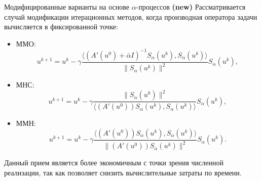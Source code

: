 \documentclass[10pt,pdf, mathserif, hyperref={unicode}]{beamer}
\begin{document}
\begin{frame}{ Модифицированные варианты на основе $\alpha$-процессов \textbf{(new)}}
	Рассматривается случай модификации итерационных методов, когда производная оператора задачи вычисляется 
        в фиксированной точке:
	\begin{itemize}
		\item ММО: $$u^{k+1}=u^k-\gamma\frac{\big\langle(A'(u^0)+\bar{\alpha}I)^{-1}S_\alpha(u^k),S_\alpha(u^k)\big\rangle}{\|S_\alpha(u^k)\|^2}S_\alpha(u^k),$$
		\item МНС:
		$$u^{k+1}=u^k-\gamma\frac{\|S_\alpha(u^k)\|^2}{\big\langle(A'(u^0))S_\alpha(u^k), S_\alpha(u^k)\big\rangle}S_\alpha(u^k),$$
		\item ММН:
		$$u^{k+1}=u^k-\gamma\frac{\big\langle(A'(u^0))S_\alpha(u^k), S_\alpha(u^k)\big\rangle}{\|(A'(u^0))S_\alpha(u^k)\|^2}S_\alpha(u^k).$$
	\end{itemize}
	
	\smallskip
	Данный прием является более экономичным с точки зрения численной реализации, так как позволяет снизить вычислительные затраты по времени.
\end{frame}
\end{document}
